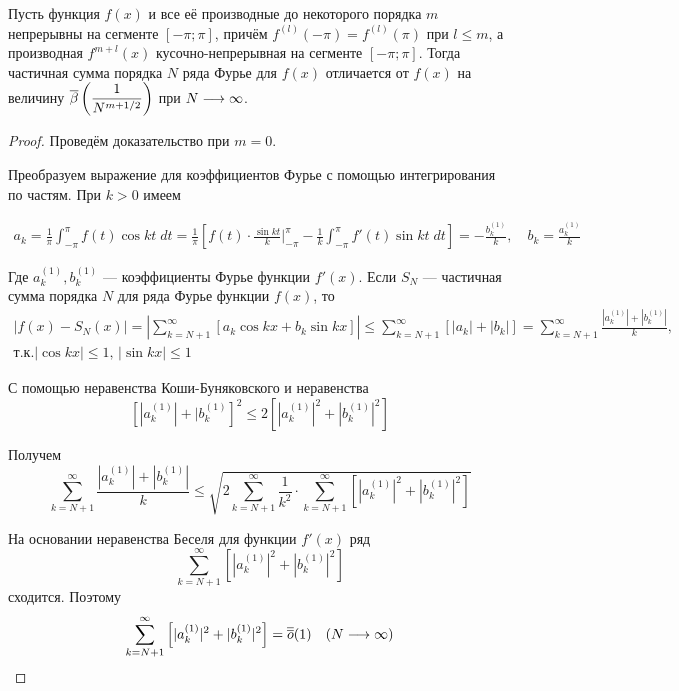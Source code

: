 \begin{theorem}
    Пусть функция $f(x)$ и все её производные до некоторого порядка $m$ 
    непрерывны на сегменте $[-\pi; \pi]$, причём $f^{(l)}(-\pi) = f^{(l)}(\pi)$
    при $l \leq m$, а производная $f^{m + l}(x)$ кусочно-непрерывная на
    сегменте $[-\pi; \pi]$. Тогда частичная сумма порядка $N$ ряда Фурье
    для $f(x)$ отличается от $f(x)$ на величину 
    $\overline{\beta}\left( \displaystyle\frac{1}{N^{m + 1/2}} \right)$ при
    $N \underset{}{\longrightarrow} \infty$.
\end{theorem}
\begin{proof}
    Проведём доказательство при $m = 0$.

    Преобразуем выражение для коэффициентов Фурье с помощью интегрирования
    по частям. При $k > 0$ имеем

    \begin{align*}
        a_k = \frac{1}{\pi} \int_{-\pi}^\pi f(t) \cos kt \; dt =
        \frac{1}{\pi} \left[ f(t) \cdot \frac{\sin kt}{k} \Bigg|_{-\pi}^\pi -
        \frac{1}{k} \int_{-\pi}^\pi f'(t) \sin kt \; dt \right] =
        -\frac{b_k^{(1)}}{k}, \quad b_k = \frac{a_k^{(1)}}{k}
    \end{align*}

    Где $a_k^{(1)}, b_k^{(1)}$ --- коэффициенты Фурье функции $f'(x)$. Если
    $S_N$ --- частичная сумма порядка $N$ для ряда Фурье функции $f(x)$, то
    \begin{align*}
        |f(x) - S_N(x)| = \left| \sum_{k = N + 1}^\infty [a_k \cos kx +
        b_k \sin kx] \right| \leq \sum_{k = N + 1}^\infty [|a_k| + |b_k|] = 
        \sum_{k = N + 1}^\infty \frac{|a_k^{(1)}| + |b_k^{(1)}|}{k}, \\
        \text{т.к.} |\cos kx| \leq 1, \, |\sin kx| \leq 1
    \end{align*}

    С помощью неравенства Коши-Буняковского и неравенства
    \[ 
        \left[ |a_k^{(1)}| + |b_k^{(1)} \right]^2 \leq 
        2 \left[ |a_k^{(1)}|^2 + |b_k^{(1)}|^2 \right] 
    \]

    Получем
    \[ 
        \sum_{k = N + 1}^\infty \frac{|a_k^{(1)}| + |b_k^{(1)}|}{k} \leq
        \sqrt{2 \sum_{k = N + 1}^\infty \frac{1}{k^2} \cdot 
        \sum_{k = N + 1}^\infty \left[ |a_k^{(1)}|^2 + |b_k^{(1)}|^2 \right]}
    \]

    На основании неравенства Беселя для функции $f'(x)$ ряд 
    \[ \sum_{k = N + 1}^\infty \left[ |a_k^{(1)}|^2 + |b_k^{(1)}|^2 \right] \]
    сходится. Поэтому
    \[ 
        \sum_{k = N + 1}^\infty \left[ |a_k^{(1)}|^2 + |b_k^{(1)}|^2 \right] =
        \overline{\overline{o}}(1) \quad (N \underset{}{\longrightarrow} \infty)
    \]


\end{proof}
